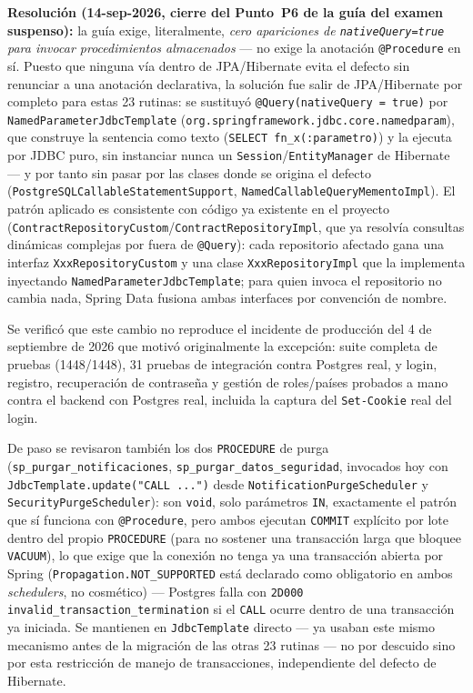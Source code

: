 \textbf{Resolución (14-sep-2026, cierre del Punto~P6 de la guía del examen suspenso):} la guía
exige, literalmente, \emph{cero apariciones de \texttt{nativeQuery=true} para invocar
procedimientos almacenados} --- no exige la anotación \texttt{@Procedure} en sí. Puesto que ninguna
vía dentro de JPA/Hibernate evita el defecto sin renunciar a una anotación declarativa, la solución
fue salir de JPA/Hibernate por completo para estas 23 rutinas: se sustituyó
\texttt{@Query(nativeQuery = true)} por \texttt{NamedParameterJdbcTemplate}
(\texttt{org.springframework.jdbc.core.namedparam}), que construye la sentencia como texto
(\texttt{SELECT fn\_x(:parametro)}) y la ejecuta por JDBC puro, sin instanciar nunca un
\texttt{Session}/\texttt{EntityManager} de Hibernate --- y por tanto sin pasar por las clases donde
se origina el defecto (\texttt{PostgreSQLCallableStatementSupport},
\texttt{NamedCallableQueryMementoImpl}). El patrón aplicado es consistente con código ya existente
en el proyecto (\texttt{ContractRepositoryCustom}/\texttt{ContractRepositoryImpl}, que ya resolvía
consultas dinámicas complejas por fuera de \texttt{@Query}): cada repositorio afectado gana una
interfaz \texttt{XxxRepositoryCustom} y una clase \texttt{XxxRepositoryImpl} que la implementa
inyectando \texttt{NamedParameterJdbcTemplate}; para quien invoca el repositorio no cambia nada,
Spring Data fusiona ambas interfaces por convención de nombre.

Se verificó que este cambio no reproduce el incidente de producción del 4 de septiembre de 2026 que
motivó originalmente la excepción: suite completa de pruebas (1448/1448), 31 pruebas de integración
contra Postgres real, y login, registro, recuperación de contraseña y gestión de roles/países
probados a mano contra el backend con Postgres real, incluida la captura del \texttt{Set-Cookie}
real del login.

De paso se revisaron también los dos \texttt{PROCEDURE} de purga
(\texttt{sp\_purgar\_notificaciones}, \texttt{sp\_purgar\_datos\_seguridad}, invocados hoy con
\texttt{JdbcTemplate.update("CALL ...")} desde \texttt{NotificationPurgeScheduler} y
\texttt{SecurityPurgeScheduler}): son \texttt{void}, solo parámetros \texttt{IN}, exactamente el
patrón que sí funciona con \texttt{@Procedure}, pero ambos ejecutan \texttt{COMMIT} explícito por
lote dentro del propio \texttt{PROCEDURE} (para no sostener una transacción larga que bloquee
\texttt{VACUUM}), lo que exige que la conexión no tenga ya una transacción abierta por Spring
(\texttt{Propagation.NOT\_SUPPORTED} está declarado como obligatorio en ambos \textit{schedulers},
no cosmético) --- Postgres falla con \texttt{2D000 invalid\_transaction\_termination} si el
\texttt{CALL} ocurre dentro de una transacción ya iniciada. Se mantienen en \texttt{JdbcTemplate}
directo --- ya usaban este mismo mecanismo antes de la migración de las otras 23 rutinas --- no por
descuido sino por esta restricción de manejo de transacciones, independiente del defecto de
Hibernate.

